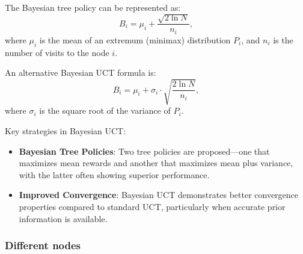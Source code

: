 The Bayesian tree policy can be represented as:
\begin{equation}
    B_i = \mu_i + \frac{\sqrt{2 \ln N}}{n_i},
\end{equation}
where \( \mu_i \) is the mean of an extremum (minimax) distribution \( P_i \), and \( n_i \) is the number of visits to the node \( i \).

An alternative Bayesian UCT formula is:
\begin{equation}
    B_i = \mu_i + \sigma_i \cdot \sqrt{\frac{2 \ln N}{n_i}},
\end{equation}
where \( \sigma_i \) is the square root of the variance of \( P_i \).

Key strategies in Bayesian UCT:
\begin{itemize}
    \item \textbf{Bayesian Tree Policies}: Two tree policies are proposed—one that maximizes mean rewards and another that maximizes mean plus variance, with the latter often showing superior performance.
    \item \textbf{Improved Convergence}: Bayesian UCT demonstrates better convergence properties compared to standard UCT, particularly when accurate prior information is available.
\end{itemize}

\subsubsection{Different nodes}